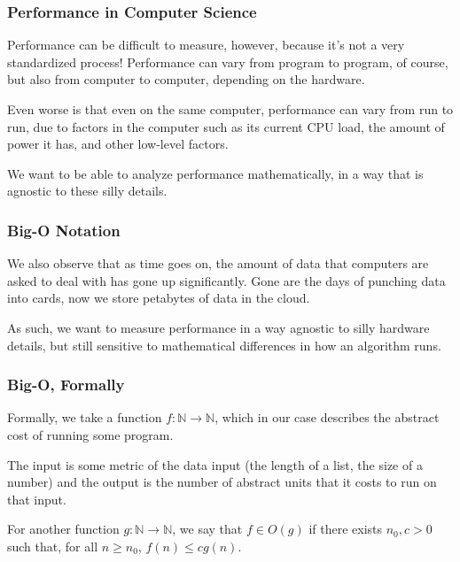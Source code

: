 \documentclass[aspectratio=169]{beamer}
\begin{document}
\begin{frame}[fragile]
  \frametitle{Performance in Computer Science}

  Performance can be difficult to measure, however, because it's not a very
  standardized process! Performance can vary from program to program, of course,
  but also from computer to computer, depending on the hardware.

  \pause
  \vspace{\fill}

  Even worse is that even on the same computer, performance can vary from run to
  run, due to factors in the computer such as its current CPU load, the amount of
  power it has, and other low-level factors.

  \pause
  \vspace{\fill}

  We want to be able to analyze performance mathematically, in a way that is
  agnostic to these silly details.
\end{frame}

\begin{frame}[fragile]
  \frametitle{Big-O Notation}

  \ptmt

  We also observe that as time goes on, the amount of data that computers are
  asked to deal with has gone up significantly. Gone are the days of punching
  data into cards, now we store petabytes of data in the cloud.

  \pause
  \vspace{\fill}

  As such, we want to measure performance in a way agnostic to silly hardware
  details, but still sensitive to mathematical differences in how an algorithm
  runs.

  \pause
  \vspace{\fill}

\end{frame}

\begin{frame}[fragile]
  \frametitle{Big-O, Formally}

  Formally, we take a function $f : \mathbb{N} \to \mathbb{N}$, which in
  our case describes the abstract cost of running some program.

  \pause
  \vspace{\fill}

  The input is some metric of the data input (the length of a list, the
  size of a number) and the output is the number of abstract units that it
  costs to run on that input.

  \pause
  \vspace{\fill}

  For another function $g : \mathbb{N} \to \mathbb{N}$, we say that
  $f \in O(g)$ if there exists $n_0, c > 0$ such that, for all $n \geq n_0$,
  $f(n) \leq cg(n)$.
\end{frame}
\end{document}
